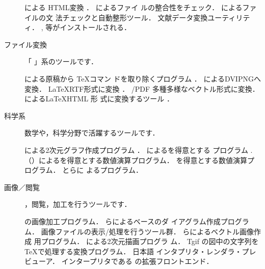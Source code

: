 \begin{description}
\begin{rpmlist}
    による \textto HTML変換
    ．
      による\BibTeX ファイ
     ルの整合性をチェック．
      による\BibTeX ファイルの文
      法チェックと自動整形ツール．
      文献データ変換ユーティリティ．
    , 等がインストールされる．
\end{rpmlist} 
\item[ファイル変換] 「 \textto {}」系のツールです．
\begin{rpmlist}
        による原稿から \TeX コマン
  ドを取り除くプログラム  ．
       によるDVI\textto PNGへ変換．
    \LaTeX \textto RTF形式に変換
        ．
     \PS/PDF \textto 多種多様なベクトル形式に変換．
   による\LaTeX \textto HTML 形
  式に変換するツール ．
\end{rpmlist} 
\item[科学系] 数学や，科学分野で活躍するツールです．
\begin{rpmlist}
    による2次元グラフ作成プログラム
     ．
    によるを得意とする
     プログラム  .
     （）によるを得意とする数値演算プログラム\SciLab．
         を得意とする数値演算プログラム．
   とらに
     よるプログラム．
\end{rpmlist} 
\item[画像／閲覧] ，閲覧，加工を行うツールです．
\begin{rpmlist}
          \gnu の画像加工プログラム．
           らによるベースのダ
  イアグラム作成プログラム．
   画像ファイルの表示/処理を行うツール群．
          らによるベクトル画像作成
    用プログラム．
    による2次元描画プログラ
    ム．
      Tgif の図中の文字列を \TeX で処理する変換プログラム．
   日本語 \PS インタプリタ・レンダラ・プレビューア．
            \PS インタープリタである \GS の拡張フロントエンド．
\end{rpmlist}
\end{description}

